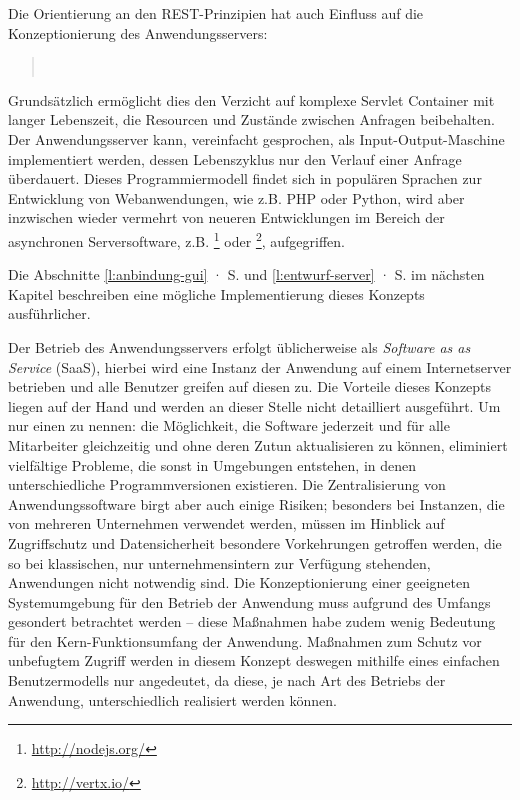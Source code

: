 Die Orientierung an den REST-Prinzipien hat auch Einfluss auf die Konzeptionierung des Anwendungsservers: 

\begin{quote}
~\cite{rest}
\end{quote}

Grundsätzlich ermöglicht dies den Verzicht auf komplexe Servlet Container mit langer Lebenszeit, die Resourcen und Zustände zwischen Anfragen beibehalten. Der Anwendungsserver kann, vereinfacht gesprochen, als Input-Output-Maschine implementiert werden, dessen Lebenszyklus nur den Verlauf einer Anfrage überdauert. Dieses Programmiermodell findet sich in populären Sprachen zur Entwicklung von Webanwendungen, wie z.B. PHP oder Python, wird aber inzwischen wieder vermehrt von neueren Entwicklungen im Bereich der asynchronen Serversoftware, z.B. \footnote{\url{http://nodejs.org/}} oder \footnote{\url{http://vertx.io/}}, aufgegriffen.

Die Abschnitte \ref{l:anbindung-gui} · S.\pageref{l:anbindung-gui} und \ref{l:entwurf-server} · S.\pageref{l:entwurf-server} im nächsten Kapitel beschreiben eine mögliche Implementierung dieses Konzepts ausführlicher.

Der Betrieb des Anwendungsservers erfolgt üblicherweise als \emph{Software as as Service} (SaaS), hierbei wird eine Instanz der Anwendung auf einem Internetserver betrieben und alle Benutzer greifen auf diesen zu. Die Vorteile dieses Konzepts liegen auf der Hand und werden an dieser Stelle nicht detailliert ausgeführt. Um nur einen zu nennen: die Möglichkeit, die Software jederzeit und für alle Mitarbeiter gleichzeitig und ohne deren Zutun aktualisieren zu können, eliminiert vielfältige Probleme, die sonst in Umgebungen entstehen, in denen unterschiedliche Programmversionen existieren. Die Zentralisierung von Anwendungssoftware birgt aber auch einige Risiken; besonders bei Instanzen, die von mehreren Unternehmen verwendet werden, müssen im Hinblick auf Zugriffschutz und Datensicherheit besondere Vorkehrungen getroffen werden, die so bei klassischen, nur unternehmensintern zur Verfügung stehenden, Anwendungen nicht notwendig sind. Die Konzeptionierung einer geeigneten Systemumgebung für den Betrieb der Anwendung muss aufgrund des Umfangs gesondert betrachtet werden -- diese Maßnahmen habe zudem wenig Bedeutung für den Kern-Funktionsumfang der Anwendung. Maßnahmen zum Schutz vor unbefugtem Zugriff werden in diesem Konzept deswegen mithilfe eines einfachen Benutzermodells nur angedeutet, da diese, je nach Art des Betriebs der Anwendung, unterschiedlich realisiert werden können.

